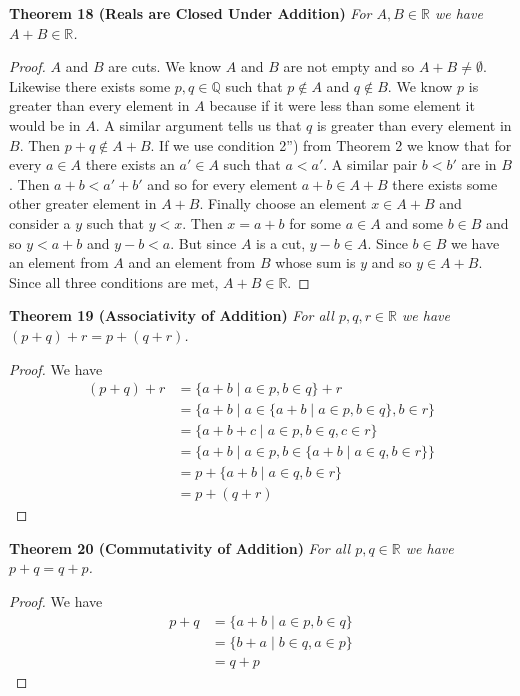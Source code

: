 \documentclass{article}
\begin{document}
\begin{flushleft}
\textbf{Theorem 18 (Reals are Closed Under Addition)}
\textsl{For $A, B \in \mathbb{R}$ we have $A + B \in \mathbb{R}$.}
\begin{proof}
$A$ and $B$ are cuts. We know $A$ and $B$ are not empty and so $A+B \neq \emptyset$. Likewise there exists some $p,q \in \mathbb{Q}$ such that $p \notin A$ and $q \notin B$. We know $p$ is greater than every element in $A$ because if it were less than some element it would be in $A$. A similar argument tells us that $q$ is greater than every element in $B$. Then $p+q \notin A+B$. If we use condition 2'') from Theorem 2 we know that for every $a \in A$ there exists an $a' \in A$ such that $a<a'$. A similar pair $b<b'$ are in $B$. Then $a+b<a'+b'$ and so for every element $a+b \in A+B$ there exists some other greater element in $A+B$. Finally choose an element $x \in A+B$ and consider a $y$ such that $y<x$. Then $x = a+b$ for some $a \in A$ and some $b \in B$ and so $y<a+b$ and $y-b<a$. But since $A$ is a cut, $y-b \in A$. Since $b \in B$ we have an element from $A$ and an element from $B$ whose sum is $y$ and so $y \in A+B$. Since all three conditions are met, $A+B \in \mathbb{R}$.
\end{proof}

\textbf{Theorem 19 (Associativity of Addition)}
\textsl{For all $p,q,r \in \mathbb{R}$ we have $(p+q)+r=p+(q+r)$.}
\begin{proof}
We have
\begin{align*}
(p+q)+r&=\{a+b \mid a \in p, b \in q\} + r \\
	  &=\{a+b \mid a \in \{a+b \mid a \in p, b \in q\}, b \in r\} \\
	  &=\{a+b+c \mid a \in p, b \in q, c \in r\} \\
	  &=\{a+b \mid a \in p, b \in \{a+b \mid a \in q, b \in r\}\} \\
	  &=p + \{a+b \mid a \in q, b \in r\} \\
	  &=p + (q+r)
\end{align*}
\end{proof}

\textbf{Theorem 20 (Commutativity of Addition)}
\textsl{For all $p,q \in \mathbb{R}$ we have $p+q = q+p$.}
\begin{proof}
We have
\begin{align*}
p+q &=\{a+b \mid a \in p, b \in q\} \\
     &=\{b+a \mid b \in q, a \in p\} \\
     &=q+p
\end{align*}
\end{proof}


\end{flushleft}
\end{document}
